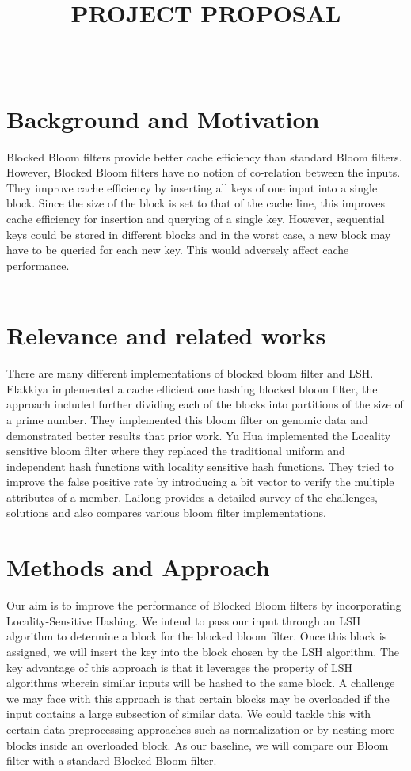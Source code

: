 \documentclass{lxaiproposal}
\title{PROJECT PROPOSAL}
\author{\coord{Apoorv}{Walia}{1} \\
         \coord{Avi}{Singhal}{2}
        }
\affil{2}{Rice University, Houston, TX}}
\begin{document}
  \maketitle
  \section{Background and Motivation}

  Blocked Bloom filters provide better cache efficiency than standard Bloom filters. However, Blocked Bloom filters 
  have no notion of co-relation between the inputs. They improve cache efficiency by inserting all keys of one input
  into a single block. Since the size of the block is set to that of the cache line, this improves cache efficiency for insertion 
  and querying of a single key. However, sequential keys could be stored in different blocks and in the worst case, a new
  block may have to be queried for each new key. This would adversely affect cache performance. \\ \\

  
  
  
  \section{Relevance and related works}
 
  There are many different implementations of blocked bloom filter and LSH. Elakkiya \cite{1} implemented a cache efficient one hashing blocked bloom filter, the approach included further dividing each of the blocks into partitions of the size of a prime number. 
  They implemented this bloom filter on genomic data and demonstrated better results that prior work. Yu Hua \cite{2} implemented the Locality sensitive bloom filter where they replaced the traditional uniform and independent hash functions with locality sensitive hash functions. 
  They tried to improve the false positive rate by introducing a bit vector to verify the multiple attributes of a member. Lailong \cite{3} provides a detailed survey of the challenges, solutions and also compares various bloom filter implementations.
  
  \section{Methods and Approach}

  Our aim is to improve the performance of Blocked Bloom filters by incorporating Locality-Sensitive Hashing. We intend to pass our input through an LSH algorithm
  to determine a block for the blocked bloom filter. Once this block is assigned, we will insert the key into the block chosen by the LSH algorithm.
  The key advantage of this approach is that it leverages the property of LSH algorithms wherein similar inputs will be hashed to the same block. A challenge we may face with this 
  approach is that certain blocks may be overloaded if the input contains a large subsection of similar data. We could tackle this with certain data preprocessing approaches such as normalization or 
  by nesting more blocks inside an overloaded block.
  As our baseline, we will compare our Bloom filter with a standard Blocked Bloom filter. 
\end{document}
